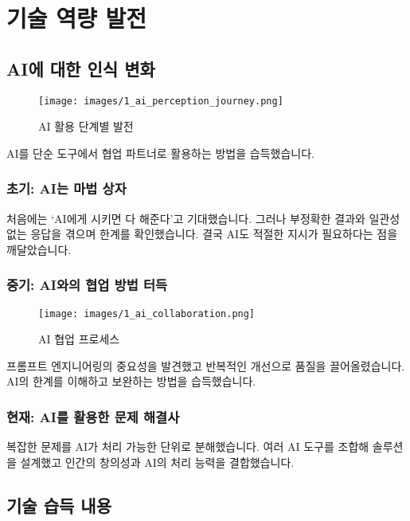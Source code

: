 \section{기술 역량 발전}

\subsection{AI에 대한 인식 변화}

\begin{figure}[h]
    \texttt{[image: images/1\_ai\_perception\_journey.png]}
    \caption{AI 활용 단계별 발전}
    \label{fig:ai_perception_journey}
\end{figure}

AI를 단순 도구에서 협업 파트너로 활용하는 방법을 습득했습니다.

\subsubsection{초기: AI는 마법 상자}

처음에는 ‘AI에게 시키면 다 해준다’고 기대했습니다. 그러나 부정확한 결과와 일관성 없는 응답을 겪으며 한계를 확인했습니다. 결국 AI도 적절한 지시가 필요하다는 점을 깨달았습니다.

\subsubsection{중기: AI와의 협업 방법 터득}

\begin{figure}[h]
    \texttt{[image: images/1\_ai\_collaboration.png]}
    \caption{AI 협업 프로세스}
    \label{fig:ai_collaboration}
\end{figure}

프롬프트 엔지니어링의 중요성을 발견했고 반복적인 개선으로 품질을 끌어올렸습니다. AI의 한계를 이해하고 보완하는 방법을 습득했습니다.

\subsubsection{현재: AI를 활용한 문제 해결사}

복잡한 문제를 AI가 처리 가능한 단위로 분해했습니다. 여러 AI 도구를 조합해 솔루션을 설계했고 인간의 창의성과 AI의 처리 능력을 결합했습니다.

\subsection{기술 습득 내용}


